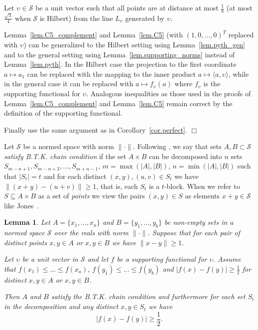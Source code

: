 \documentclass{article}
\newenvironment{proofof}[1]{\noindent {\bf Proof of #1}}{\hspace*{\fill}$\Box$}
\newtheorem{lemma} [theorem] {Lemma}\newtheorem{attempt} [theorem] {Attempt}\newtheorem{corollary} [theorem] {Corollary}\newtheorem{prop} [theorem] {Proposition}\newtheorem{definition} [theorem] {Definition}\newtheorem{remark} [theorem] {Remark}\newtheorem{conjecture} [theorem] {Conjecture}\newtheorem{claim} [theorem] {Claim}
\begin{document}
\begin{proofof}{Lemma~\ref{lem.perfect_gen}}
    Let $\upsilon \in \mathcal{S}$ be a unit vector such that all points are at distance at most $\frac 1 8$ (at most $\frac {\sqrt 3} 4$ when $\mathcal{S}$ is Hilbert) from 
    the line $L_{\upsilon}$ generated by $\upsilon$. 
 
Lemma~\ref{lem.C5_complement} and Lemma~\ref{lem.C5} (with $(1,0,\dots,0)^T$ replaced with $\upsilon$)
    can be generalized to the Hilbert setting using Lemma~\ref{lem.pyth_gen} and to the general setting using Lemma~\ref{lem.supporting_norms} instead of Lemma~\ref{lem.pyth}. In the Hilbert case the projection to the first coordinate $a \mapsto a_1$ can be replaced with the mapping to the inner product $a \mapsto \langle a, \upsilon \rangle$, while in the general case it can be replaced with $a \mapsto f_\upsilon(a)$ where $f_\upsilon$ is the supporting functional for $\upsilon$. Analogous inequalities as those used in the proofs of Lemma~\ref{lem.C5_complement} and Lemma~\ref{lem.C5}
    remain correct by the definition of the supporting functional.

    Finally use the same argument as in Corollary~\ref{cor.perfect}.
\end{proofof}

\medskip


Let $\mathcal{S}$ be a normed space with norm $\|\cdot\|$.
Following \cite{jones, LR}, we say that sets $A, B \subset \mathcal{S}$ \emph{satisfy B.T.K. chain condition} if
the set $A \times B$ can be decomposed into $n$ sets $S_{m-n+1}, S_{m-n+3}, \dots, S_{m+n-1}$,
$m=\max(|A|, |B|)$, $n=\min(|A|, |B|)$
such that $|S_t|=t$ and for each distinct 
$(x, y), (u, v) \in S_t$ we have $\|(x+y) - (u+v)\| \ge 1$, that is, each $S_t$ is a $t$-block.
When we refer to $S \subseteq A \times B$ as a set of \emph{points} we view the pairs $(x,y) \in S$ as elements $x+y \in \mathcal{S}$
like Jones~\cite{jones}. 

\begin{lemma}\label{lem.btk_strip2}
    Let $A=\{x_1, \dots, x_a\}$ and $B=\{y_1, \dots, y_b\}$ be non-empty sets in a normed space $\mathcal{S}$ over the reals with norm $\|\cdot\|$.
    Suppose that for each pair of distinct points $x,y \in A$
    or $x,y \in B$ we have $\|x - y\| \ge 1$. 


    Let $\upsilon$ be a unit vector in $\mathcal{S}$ and let $f$ be a supporting functional for $\upsilon$.
    Assume that $f(x_1) \le \dots \le f(x_a)$, $f(y_1) \le \dots \le f(y_b)$ and $|f(x) - f(y)| \ge \frac 1 2$ for distinct $x,y \in A$  or $x,y \in B$.
   
    Then $A$ and $B$ satisfy the B.T.K. chain condition and furthermore
    for each set $S_t$ in the decomposition and any distinct $x,y \in S_t$
    we have 
    \begin{equation}\label{eq.supporting_separation}
        |f(x) - f(y)| \ge \frac 1 2.
    \end{equation}
\end{lemma}
\end{document}
